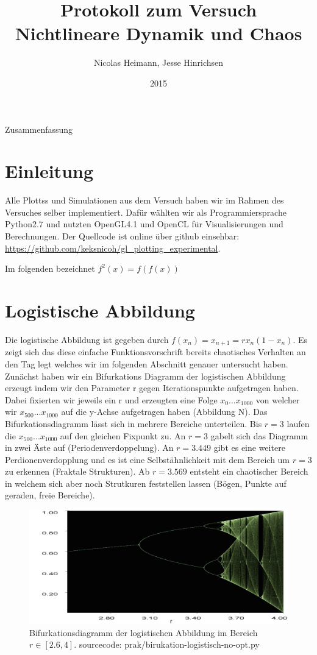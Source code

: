 \documentclass{scrartcl}
\title{Protokoll zum Versuch Nichtlineare Dynamik und Chaos}
\author{Nicolas Heimann, Jesse Hinrichsen}
\affil{\textit{Universität Hamburg}}
\date{2015}
\begin{document}
\maketitle




\begin{description}
\item Zusammenfassung
\end{description}


\section{  Einleitung  }
Alle Plottss und Simulationen aus dem Versuch haben wir im Rahmen des Versuches selber implementiert. Dafür wählten wir als Programmiersprache Python2.7 und nutzten OpenGL4.1 und OpenCL für Visualisierungen und Berechnungen. Der Quellcode ist online über github einsehbar: \url{https://github.com/keksnicoh/gl_plotting_experimental}.  

Im folgenden bezeichnet $f^2(x) = f(f(x))$

\section{Logistische Abbildung}
Die logistische Abbildung ist gegeben durch $f(x_n)=x_{n+1}=rx_n(1-x_n)$. Es zeigt sich das diese einfache Funktionsvorschrift 
bereits chaotisches Verhalten an den Tag legt welches wir im folgenden Abschnitt genauer untersucht haben. Zunächst haben 
wir ein Bifurkations Diagramm der logistischen Abbildung erzeugt indem wir den Parameter r gegen Iterationspunkte aufgetragen haben. Dabei fixierten wir jeweils ein r und erzeugten eine Folge $x_0 ... x_{1000}$ von welcher wir $x_{500} ... x_{1000}$ auf die y-Achse aufgetragen haben (Abbildung N).
Das Bifurkationsdiagramm lässt sich in mehrere Bereiche unterteilen. Bis $r=3$ laufen die $x_{500}...x_{1000}$ auf den gleichen Fixpunkt zu. An $r=3$ gabelt sich das Diagramm in zwei Äste auf (Periodenverdoppelung). An $r=3.449$ gibt es eine weitere Perdionenverdopplung und es ist eine Selbstähnlichkeit mit dem Bereich um $r=3$ zu erkennen (Fraktale Strukturen). Ab $r=3.569$ entsteht ein chaotischer Bereich in welchem sich aber noch Strutkuren feststellen lassen (Bögen, Punkte auf geraden, freie Bereiche).
\begin{figure}
	\centering
	\includegraphics[scale=0.25]{bifurkation}
	\caption{Bifurkationsdiagramm der logistischen Abbildung im Bereich $r\in[2.6,4]$. sourcecode: prak/birukation-logistisch-no-opt.py}
	\label{bifurkation}
\end{figure}
\end{document}
